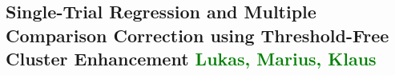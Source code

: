 \subsection{Single-Trial Regression and Multiple Comparison Correction using Threshold-Free Cluster Enhancement \textcolor{green}{Lukas, Marius, Klaus}}
